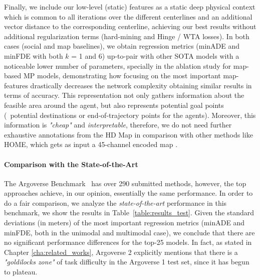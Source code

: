 Finally, we include our low-level (static) features as a static deep physical context which is common to all iterations over the different centerlines and an additional vector distance to the corresponding centerline, achieving our best results without additional regularization terms (hard-mining and Hinge / WTA losses). In both cases (social and map baselines), we obtain regression metrics (minADE and minFDE with both $k$ = 1 and 6) up-to-pair with other SOTA models with a noticeable lower number of parameters, specially in the ablation study for map-based MP models, demonstrating how focusing on the most important map-features drastically decreases the network complexity obtaining similar results in terms of accuracy. This representation not only gathers information about the feasible area around the agent, but also represents potential goal points \cite{dendorfer2020goal} (\ie \ potential destinations or end-of-trajectory points for the agents). Moreover, this information is \textit{"cheap"} and \textit{interpretable}, therefore, we do not need further exhaustive annotations from the HD Map in comparison with other methods like HOME, which gets as input a 45-channel encoded map \cite{gilles2021home}. 

\paragraph{Comparison with the State-of-the-Art}

The Argoverse Benchmark~\cite{chang2019argoverse} has over 290 submitted methods, however, the top approaches achieve, in our opinion, essentially the same performance. In order to do a fair comparison, we analyze the \textit{state-of-the-art} performance in this benchmark, we show the results in Table~\ref{table:results_test}. Given the standard deviations (in meters) of the most important regression metrics (minADE and minFDE, both in the unimodal and multimodal case), we conclude that there are no significant performance differences for the top-25 models. In fact, as stated in Chapter \ref{cha:related_works}, Argoverse 2 \cite{wilson2023argoverse} explicitly mentions that there is a \textit{"goldilocks zone"} of task difficulty in the Argoverse 1 test set, since it has begun to plateau.


